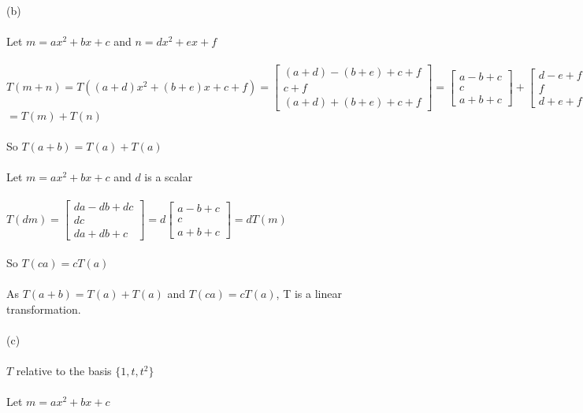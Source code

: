 \documentclass{article}
\begin{document}
\indent(b)
\\\\
\indent\indent
Let
$
m = ax^2 + bx + c
$
and
$
n = dx^2 + ex + f
$
\\\\
\indent\indent
$
T(m + n) = T((a+d)x^2 + (b+e)x + c + f) = \begin{bmatrix}(a+d) - (b+e) + c + f\\c + f\\(a + d) + (b + e) + c + f\end{bmatrix} = \begin{bmatrix}a - b + c\\c\\a + b + c\end{bmatrix} + \begin{bmatrix}d - e + f\\f\\d + e + f\end{bmatrix} 
$
\\
\indent\indent\indent\indent\space\space\space\space
$
= T(m) + T(n)
$
\\\\
\indent\indent\indent
So $T(a + b) = T(a) + T(a)$
\\\\
\indent\indent
Let
$
m = ax^2 + bx + c
$
and $d$ is a scalar
\\\\
\indent\indent
$
T(dm) = \begin{bmatrix}da - db + dc\\dc\\da + db + c\end{bmatrix} = d\begin{bmatrix}a - b + c\\c\\a + b + c\end{bmatrix} = dT(m)
$
\\\\
\indent\indent\indent
So $T(ca) = cT(a)$
\\\\
\indent\indent
As $T(a + b) = T(a) + T(a)$ and $T(ca) = cT(a)$, T is a linear transformation.
\\\\
\indent(c)
\\\\
\indent\indent
$T$ relative to the basis $\{1, t, t^2\}$
\\\\
\indent\indent
Let $m = ax^2 + bx + c$
\indent\indent
\end{document}
